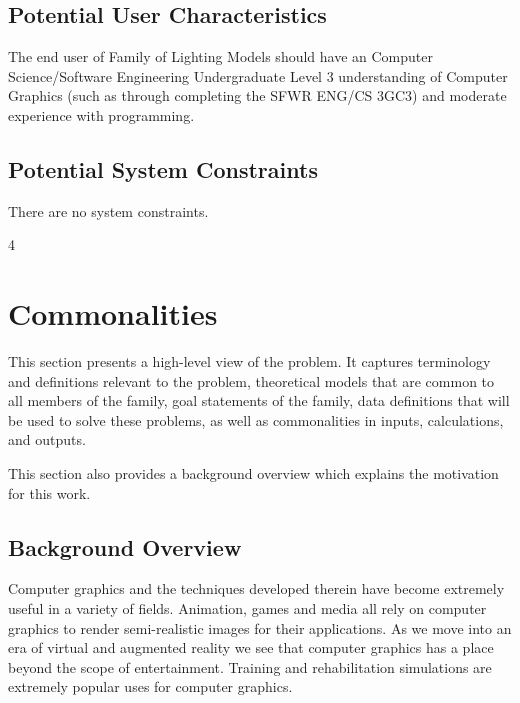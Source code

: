 \documentclass[12pt]{article}
\newcommand{\famname}{Family of Lighting Models} %
\begin{document}
\subsection{Potential User Characteristics} \label{SecUserCharacteristics}
The end user of \famname{} should have an Computer Science/Software Engineering 
Undergraduate Level 3 understanding of Computer Graphics (such as through 
completing the SFWR ENG/CS 3GC3) and moderate experience with programming.

\subsection{Potential System Constraints}
There are no system constraints.

4%
%

\section{Commonalities}
This section presents a high-level view of the problem. It captures terminology 
and definitions relevant to the problem, theoretical models that are common to 
all members of the family, goal statements of the family, data definitions that 
will be used to solve these problems, as well as commonalities in inputs, 
calculations, and outputs.

This section also provides a background overview which explains the motivation 
for this work.

\subsection{Background Overview} \label{Sec_Background}
Computer graphics and the techniques developed therein have become extremely 
useful in a variety of fields. Animation, games and media all rely on computer 
graphics to render semi-realistic images for their applications. As we move 
into an era of virtual and augmented reality we see that computer graphics has 
a place beyond the scope of entertainment. Training and rehabilitation 
simulations are extremely popular uses for computer graphics.
\end{document}
